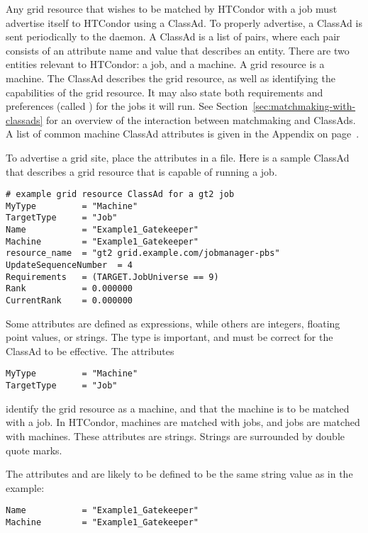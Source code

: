 Any grid resource that wishes to be matched by HTCondor with
a job must advertise itself to HTCondor using a ClassAd.
To properly advertise, a ClassAd is sent
periodically to the  daemon.
A ClassAd is a list of pairs, where each pair consists of
an attribute name and value that describes an entity.
There are two entities relevant to HTCondor:
a job, and a machine.
A grid resource is a machine.
The ClassAd describes the grid resource, as well
as identifying the capabilities of the grid resource.
It may also state both requirements and preferences
(called ) for the jobs it will run.
See
Section~\ref{sec:matchmaking-with-classads} for an overview
of the interaction between matchmaking and ClassAds.
A list of common machine ClassAd attributes is given in
the Appendix on page~\pageref{sec:Machine-ClassAd-Attributes}.

To advertise a grid site, place the attributes
in a file.
Here is a sample ClassAd that describes a grid resource
that is capable of running a
 job.

\footnotesize
\begin{verbatim}
# example grid resource ClassAd for a gt2 job
MyType         = "Machine"
TargetType     = "Job"
Name           = "Example1_Gatekeeper"
Machine        = "Example1_Gatekeeper"
resource_name  = "gt2 grid.example.com/jobmanager-pbs"
UpdateSequenceNumber  = 4
Requirements   = (TARGET.JobUniverse == 9)
Rank           = 0.000000
CurrentRank    = 0.000000
\end{verbatim}
\normalsize


Some attributes are defined as expressions, while
others are integers, floating point values, or strings.
The type is important, and must be correct for the
ClassAd to be effective.
The attributes
\begin{verbatim}
MyType         = "Machine"
TargetType     = "Job"
\end{verbatim}
identify the grid resource as a machine,
and that the machine is to be matched with a job.
In HTCondor, machines are matched with jobs, and jobs are matched with
machines.
These attributes are strings.
Strings are surrounded by double quote marks.

The attributes  and 
are likely to be defined to be the same string value as in the
example:
\footnotesize
\begin{verbatim}
Name           = "Example1_Gatekeeper"
Machine        = "Example1_Gatekeeper"
\end{verbatim}
\normalsize

